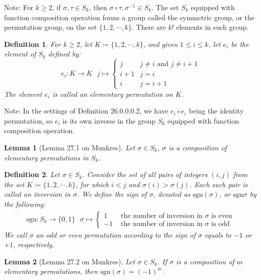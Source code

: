 \documentclass[11pt,oneside]{book}
\theoremstyle{break}
\theoremstyle{break}
\newtheorem{lem}{Lemma}[thm]
\newtheorem{defn}{Definition}[corL]
\newcommand{\sgn}{\text{sgn}}
\newcommand{\note}{\color{red}Note: \color{black}}
\begin{document}
\note For $k\geq 2$, if $\sigma, \tau \in S_k$, then $\sigma\circ \tau ,  \sigma^{-1} \in S_k$. The set $S_k$ equipped with function composition operation forms a group called the symmetric group, or the permutation group, on the set $\{1, 2,\cdots, k\}$. There are $k!$ elements in such group. \\

\begin{defn}
For $k\geq 2$, let $K \coloneqq \{ 1,2,\cdots, k\}$, and given $1 \leq i \leq k$, let $e_i$ be the element of $S_k$ defined by: 
$$e_i : K \to K \ \ \ j \mapsto \begin{cases} j & j\neq i \text{ and } j\neq i+1\\
i+1 & j=i \\
i & j=i+1
\end{cases}$$
The element $e_i$ is called an elementary permutation on $K$. 
\end{defn}

\note In the settings of Definition 26.0.0.0.2, we have $e_i \circ e_i$ being the identity permutation, so $e_i$ is its own inverse in the group $S_k$ equipped with function composition operation. \\

\begin{lem}[Lemma 27.1 on Munkres]
Let $\sigma \in S_k$, $\sigma$ is a composition of elementary permutations in $S_k$. 
\end{lem}

\begin{defn}
Let $\sigma \in S_k$. Consider the set of all pairs of integers $(i, j)$ from the set $K \coloneqq \{1,2,\cdots, k\}$, for which $i<j$ and $\sigma(i) > \sigma(j)$. Each such pair is called an inversion in $\sigma$. We define the sign of $\sigma$, denoted as $\sgn(\sigma)$, or $\sgn \sigma$ by the following:
\begin{align*}
\sgn: S_k \to \{0,1\} \ \ \ \sigma\mapsto \begin{cases}
1 & \text{ the number of inversion in }\sigma \text{ is even}\\
-1 & \text{ the number of inversion in }\sigma \text{ is odd}
\end{cases}
\end{align*}
We call $\sigma$ an odd or even permutation according to the sign of $\sigma$ equals to $-1$ or $+1$, respectively. 
\end{defn}

\begin{lem}[Lemma 27.2 on Munkres]
Let $\sigma \in S_k$. If $\sigma $ is a composition of $m$ elementary permutations, then $\sgn (\sigma) = (-1)^m$.
\end{lem}
\end{document}
